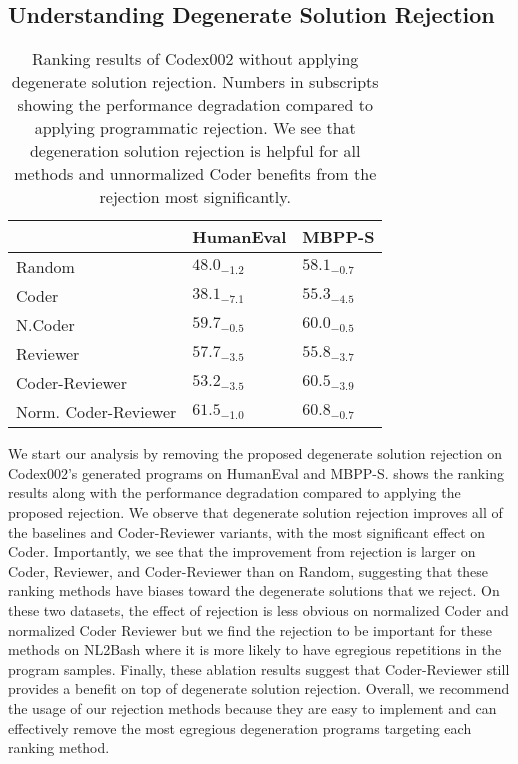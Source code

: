 \documentclass[nohyperref]{article}
\theoremstyle{plain}
\theoremstyle{definition}
\theoremstyle{remark}
\begin{document}
\subsection{Understanding Degenerate Solution Rejection}
\label{sec:rejection-ablation}
\begin{table}[]
\footnotesize
\centering
\begin{tabular}{lll}
\toprule
{} &               HumanEval &                  MBPP-S \\
\midrule
Random               &           $48.0_{-1.2}$ &           $58.1_{-0.7}$ \\
Coder                &           $38.1_{-7.1}$ &           $55.3_{-4.5}$ \\
N.Coder              &           $59.7_{-0.5}$ &           $60.0_{-0.5}$ \\
Reviewer             &           $57.7_{-3.5}$ &           $55.8_{-3.7}$ \\
Coder-Reviewer       &           $53.2_{-3.5}$ &           $60.5_{-3.9}$ \\
Norm. Coder-Reviewer &  $\mathbf{61.5}_{-1.0}$ &  $\mathbf{60.8}_{-0.7}$ \\
\bottomrule
\end{tabular}
 \caption{Ranking results of Codex002 without applying degenerate solution rejection. Numbers in subscripts showing the performance degradation compared to applying programmatic rejection.
We see that degeneration solution rejection is helpful for all methods and unnormalized Coder benefits from the rejection most significantly.
}
\vspace{-15pt}
\label{tab:ablation_table}
\end{table}

We start our analysis by removing the proposed degenerate solution rejection on Codex002's generated programs on HumanEval and MBPP-S.
 shows the ranking results along with the performance degradation compared to applying the proposed rejection.
We observe that degenerate solution rejection improves all of the baselines and Coder-Reviewer variants, with the most significant effect on Coder.
Importantly, we see that the improvement from rejection is larger on Coder, Reviewer, and Coder-Reviewer than on Random, suggesting that these ranking methods have biases toward the degenerate solutions that we reject.
On these two datasets, the effect of rejection is less obvious on normalized Coder and normalized Coder Reviewer but we find the rejection to be important for these methods on NL2Bash where it is more likely to have egregious repetitions in the program samples.
Finally, these ablation results suggest that Coder-Reviewer still provides a benefit on top of degenerate solution rejection.
Overall, we recommend the usage of our rejection methods because they are easy to implement and can effectively remove the most egregious degeneration programs targeting each ranking method.
\end{document}

